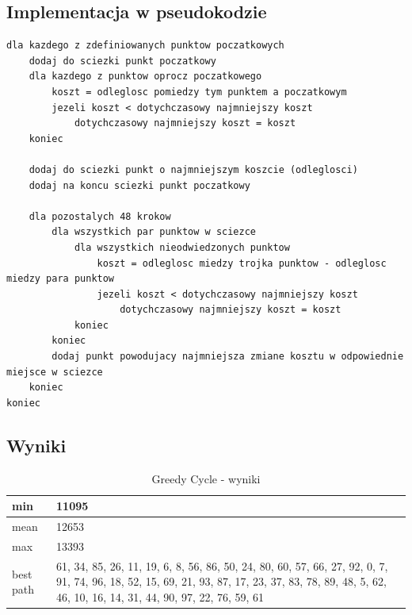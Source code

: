 \documentclass[a4paper 10pt]{article}
\begin{document}
\subsection{Implementacja w pseudokodzie}
\label{Greedy code}
\begin{lstlisting}[frame=single]
dla kazdego z zdefiniowanych punktow poczatkowych
	dodaj do sciezki punkt poczatkowy
	dla kazdego z punktow oprocz poczatkowego
		koszt = odleglosc pomiedzy tym punktem a poczatkowym
		jezeli koszt < dotychczasowy najmniejszy koszt
			dotychczasowy najmniejszy koszt = koszt
	koniec
	
	dodaj do sciezki punkt o najmniejszym koszcie (odleglosci)
	dodaj na koncu sciezki punkt poczatkowy
	
	dla pozostalych 48 krokow
		dla wszystkich par punktow w sciezce
			dla wszystkich nieodwiedzonych punktow
				koszt = odleglosc miedzy trojka punktow - odleglosc miedzy para punktow
				jezeli koszt < dotychczasowy najmniejszy koszt
					dotychczasowy najmniejszy koszt = koszt
			koniec
		koniec
		dodaj punkt powodujacy najmniejsza zmiane kosztu w odpowiednie miejsce w sciezce
	koniec	
koniec

\end{lstlisting}
\subsection{Wyniki}
\begin{table}[H]
\center
\caption{Greedy Cycle - wyniki}
\label{Greedy Cycle - wyniki}
\begin{tabular}{|p{1cm}|p{14cm}|}
\hline
min       & 11095                                                                                                                                                                                                 \\ \hline
mean      & 12653                                                                                                                                                                                                 \\ \hline
max       & 13393                                                                                                                                                                                                 \\ \hline
best path & 61, 34, 85, 26, 11, 19, 6, 8, 56, 86, 50, 24, 80, 60, 57, 66, 27, 92, 0, 7, 91, 74, 96, 18, 52, 15, 69, 21, 93, 87, 17, 23, 37, 83, 78, 89, 48, 5, 62, 46, 10, 16, 14, 31, 44, 90, 97, 22, 76, 59, 61 \\ \hline
\end{tabular}
\end{table}
\end{document}
